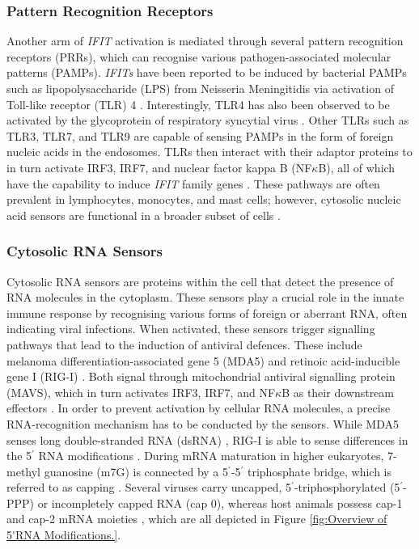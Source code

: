 \subsubsection{Pattern Recognition Receptors} \label{Pattern Recognition Receptors}
Another arm of \textit{IFIT} activation is mediated through several pattern recognition receptors (PRRs), which can recognise various pathogen-associated molecular patterns (PAMPs). \textit{IFITs} have been reported to be induced by bacterial PAMPs such as lipopolysaccharide (LPS) from Neisseria Meningitidis via activation of Toll-like receptor (TLR) 4 \cite{Zhou2013InterferonDefense.}. Interestingly, TLR4 has also been observed to be activated by the glycoprotein of respiratory syncytial virus \cite{Funchal2015RespiratoryNeutrophils}. Other TLRs such as TLR3, TLR7, and TLR9 are capable of sensing PAMPs in the form of foreign nucleic acids in the endosomes. TLRs then interact with their adaptor proteins to in turn activate IRF3, IRF7, and nuclear factor kappa B (NF\(\kappa\)B), all of which have the capability to induce \textit{IFIT} family genes \cite{Diamond2013TheProteins}. These pathways are often prevalent in lymphocytes, monocytes, and mast cells; however, cytosolic nucleic acid sensors are functional in a broader subset of cells \cite{Ablasser2011WhereFit}.

\subsubsection{Cytosolic RNA Sensors} \label{Cytosolic Nuclec Acid Sensors}
Cytosolic RNA sensors are proteins within the cell that detect the presence of RNA molecules in the cytoplasm. These sensors play a crucial role in the innate immune response by recognising various forms of foreign or aberrant RNA, often indicating viral infections. When activated, these sensors trigger signalling pathways that lead to the induction of antiviral defences. These include melanoma differentiation-associated gene 5 (MDA5) and retinoic acid-inducible gene I (RIG-I) \cite{Vladimer2014IFITs:Proteins}. Both signal through mitochondrial antiviral signalling protein (MAVS), which in turn activates IRF3, IRF7, and NF\(\kappa\)B as their downstream effectors \cite{Ashley2019Interferon-IndependentCytomegalovirus}. In order to prevent activation by cellular RNA molecules, a precise RNA-recognition mechanism has to be conducted by the sensors. While MDA5 senses long double-stranded RNA (dsRNA) \cite{Brisse2019ComparativeMDA5}, RIG-I is able to sense differences in the 5$^{\prime}$ RNA modifications \cite{Schlee2016DiscriminatingSensing}. During mRNA maturation in higher eukaryotes, 7-methyl guanosine (m7G) is connected by a 5$^{\prime}$-5$^{\prime}$ triphosphate bridge, which is referred to as capping \cite{Devarkar2016StructuralRIG-I, Ramanathan2016MRNAApplications}. Several viruses carry uncapped, 5$^{\prime}$-triphosphorylated (5$^{\prime}$-PPP) or incompletely capped RNA (cap 0), whereas host animals possess cap-1 and cap-2 mRNA moieties \cite{Choi2018ACaps}, which are all depicted in Figure \ref{fig:Overview of 5'RNA Modifications.}.


